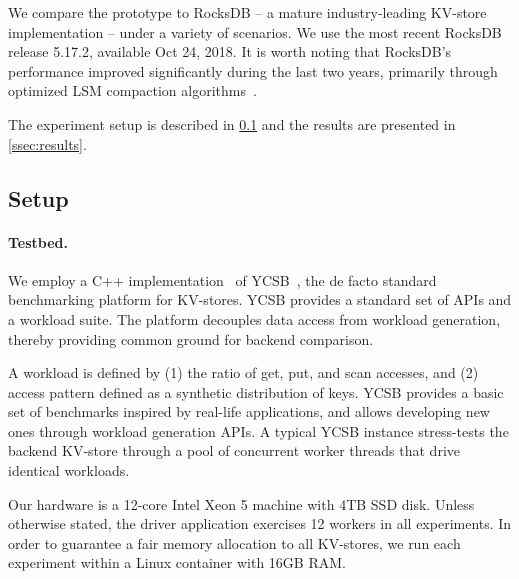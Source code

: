 We  compare the \sys\/ prototype to RocksDB -- a mature industry-leading KV-store implementation  -- under a variety of scenarios.  We use the most recent RocksDB release 5.17.2, available Oct 24, 2018.  
It is worth noting that RocksDB's performance improved significantly during the last two years, primarily through 
optimized LSM compaction algorithms~\cite{CallaghanCompaction}.   

The experiment setup is described in \cref{ssec:setup} and the results are presented in \cref{ssec:results}. 

\subsection{Setup}
\label{ssec:setup} 

\paragraph{Testbed.} We employ a C++ implementation~\cite{Cpp-YCSB} of YCSB~\cite{YCSB}, the  de facto standard  
benchmarking platform for KV-stores. 
YCSB provides a standard set of APIs and a workload suite. 
The platform decouples data access from workload generation, 
thereby providing common ground for backend comparison. 

A workload is defined by  (1) the ratio of get, put, and scan accesses, and (2) access pattern defined as a synthetic distribution of keys. 
YCSB provides a basic set of benchmarks  inspired by real-life applications, and allows developing new ones through workload 
generation APIs. A typical YCSB instance stress-tests the backend KV-store through a pool of concurrent worker threads that drive identical
workloads. %

Our hardware is a 12-core Intel Xeon 5 machine with 4TB SSD disk. Unless otherwise stated, the driver application 
exercises 12 workers in all experiments. In order to guarantee a fair memory allocation to all KV-stores, we run each 
experiment within a Linux container with 16GB RAM. 

